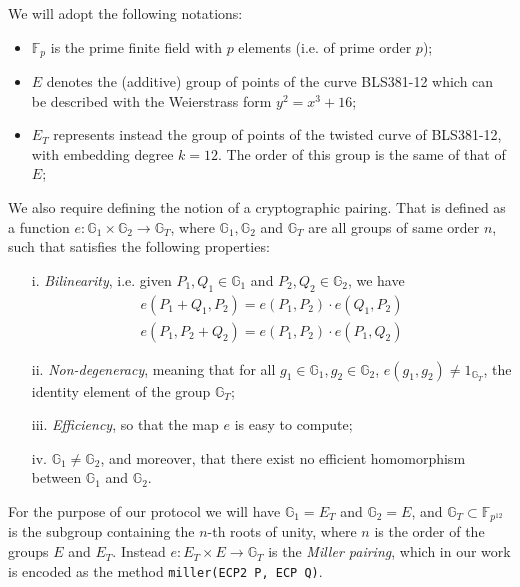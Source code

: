 We will adopt the following notations:
\begin{itemize}

\item $\mathbb{F}_p$ is the prime finite field with $p$ elements
  (i.e. of prime order $p$);

\item $E$ denotes the (additive) group of points of the curve
  BLS381-12 \cite{bls381-12} which can be described with the
  Weierstrass form $y^2=x^3 + 16$;

\item $E_T$ represents instead the group of points of the twisted
  curve of BLS381-12, with embedding degree $k=12$. The order of
  this group is the same of that of $E$;

\end{itemize}

We also require defining the notion of a cryptographic
pairing. That is defined as a function $e:
\mathbb{G}_1\times\mathbb{G}_2\to \mathbb{G}_T$, where
$\mathbb{G}_1,\mathbb{G}_2$ and $\mathbb{G}_T$ are all groups of same
order $n$, such that satisfies the following properties:

\begin{itemize}

\item [i.] \emph{Bilinearity}, i.e. given $P_1,Q_1\in\mathbb{G}_1$
  and $P_2,Q_2\in\mathbb{G}_2$, we have
  \begin{align*}
    e(P_1+Q_1,P_2) = e(P_1,P_2)\cdot e(Q_1,P_2) \\
    e(P_1,P_2+Q_2) = e(P_1,P_2)\cdot e(P_1,Q_2)
  \end{align*}

\item[ii.] \emph{Non-degeneracy}, meaning that for all
  $g_1\in\mathbb{G}_1, g_2\in\mathbb{G}_2$, $e(g_1,g_2)\ne
  1_{\mathbb{G}_T}$, the identity element of the group
  $\mathbb{G}_T$;

\item[iii.] \emph{ Efficiency}, so that the map $e$ is easy to
  compute;

\item[iv. ] $\mathbb{G}_1\ne \mathbb{G}_2$, and moreover, that
  there exist no efficient homomorphism between $\mathbb{G}_1$ and
  $\mathbb{G}_2$.

\end{itemize}

For the purpose of our protocol we will have $\mathbb{G}_1 = E_T$ and
$\mathbb{G}_2 = E$, and $\mathbb{G}_T\subset \mathbb{F}_{p^{12}}$ is
the subgroup containing the $n$-th roots of unity, where $n$ is the
order of the groups $E$ and $E_T$. Instead $e: E_T \times E\to
\mathbb{G}_T$ is the \emph{Miller pairing}, which in our work is
encoded as the method \verb!miller(ECP2 P, ECP Q)!. \\


